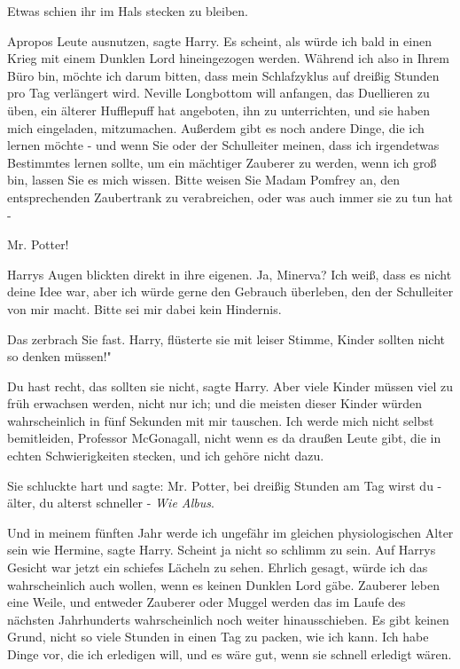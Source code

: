 Etwas schien ihr im Hals stecken zu bleiben.

\glqq Apropos Leute ausnutzen\grqq{}, sagte Harry. \glqq Es scheint, als würde
ich bald in einen Krieg mit einem Dunklen Lord hineingezogen werden. Während ich
also in Ihrem Büro bin, möchte ich darum bitten, dass mein Schlafzyklus auf
dreißig Stunden pro Tag verlängert wird. Neville Longbottom will anfangen, das
Duellieren zu üben, ein älterer Hufflepuff hat angeboten, ihn zu unterrichten,
und sie haben mich eingeladen, mitzumachen. Außerdem gibt es noch andere Dinge,
die ich lernen möchte - und wenn Sie oder der Schulleiter meinen, dass ich
irgendetwas Bestimmtes lernen sollte, um ein mächtiger Zauberer zu werden, wenn
ich groß bin, lassen Sie es mich wissen. Bitte weisen Sie Madam Pomfrey an, den
entsprechenden Zaubertrank zu verabreichen, oder was auch immer sie zu tun hat
-\grqq{}

\glqq Mr. Potter!\grqq{}

Harrys Augen blickten direkt in ihre eigenen. \glqq Ja, Minerva? Ich weiß, dass
es nicht deine Idee war, aber ich würde gerne den Gebrauch überleben, den der
Schulleiter von mir macht. Bitte sei mir dabei kein Hindernis.\grqq{}

Das zerbrach Sie fast. \glqq Harry\grqq{}, flüsterte sie mit leiser Stimme,
\glqq Kinder sollten nicht so denken müssen!"

\glqq Du hast recht, das sollten sie nicht\grqq{}, sagte Harry. \glqq Aber viele
Kinder müssen viel zu früh erwachsen werden, nicht nur ich; und die meisten
dieser Kinder würden wahrscheinlich in fünf Sekunden mit mir tauschen. Ich werde
mich nicht selbst bemitleiden, Professor McGonagall, nicht wenn es da draußen
Leute gibt, die in echten Schwierigkeiten stecken, und ich gehöre nicht
dazu.\grqq{}

Sie schluckte hart und sagte: \glqq Mr. Potter, bei dreißig Stunden am Tag wirst
du - älter, du alterst schneller -\grqq{} \emph{Wie Albus}.

\glqq Und in meinem fünften Jahr werde ich ungefähr im gleichen physiologischen
Alter sein wie Hermine\grqq{}, sagte Harry. \glqq Scheint ja nicht so schlimm zu
sein.\grqq{} Auf Harrys Gesicht war jetzt ein schiefes Lächeln zu sehen. \glqq
Ehrlich gesagt, würde ich das wahrscheinlich auch wollen, wenn es keinen Dunklen
Lord gäbe. Zauberer leben eine Weile, und entweder Zauberer oder Muggel werden
das im Laufe des nächsten Jahrhunderts wahrscheinlich noch weiter
hinausschieben. Es gibt keinen Grund, nicht so viele Stunden in einen Tag zu
packen, wie ich kann. Ich habe Dinge vor, die ich erledigen will, und es wäre
gut, wenn sie schnell erledigt wären.\grqq{}

